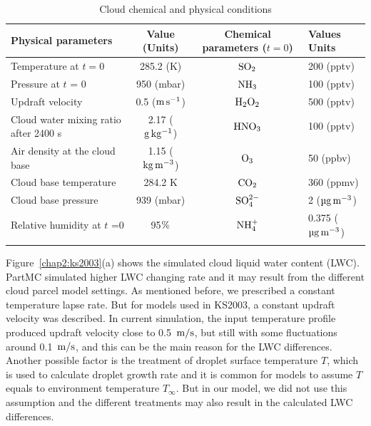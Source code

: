 \documentclass[edeposit,fullpage]{uiucthesis2009}
\makeatletter
\DeclareRobustCommand*\unit[1]
 {\ensuremath{%
   {\thinmuskip3mu\relax
    \def\mu{\text{\textmu}}\def~{\,}%
    \ifx\f@series\testbx\mathbf{#1}\else\mathrm{#1}\fi}}}
\makeatother
\begin{document}
\begin{table}[ht]
\centering
\begin{threeparttable}
\caption{Cloud  chemical and physical conditions}
 \begin{tabular}{l c|c l}
 \hline
  Physical parameters & Value (Units) & Chemical parameters ($t = 0$) & Values Units\\
 \hline
 Temperature at $t =0$ & 285.2 (K)&$\rm SO_2$ & 200 (pptv)\\
 Pressure at $t$ = 0 & 950 (mbar)&$\rm NH_3$ & 100 (pptv)\\
 Updraft velocity & 0.5 ($\rm m\,s^{-1}$)&$\rm H_2O_2$ & 500 (pptv)\\
 Cloud water mixing ratio after 2400 s& 2.17 ($\rm g\,kg^{-1}$)&$\rm HNO_3$  & 100 (pptv)\\
 Air density at the cloud base & 1.15 ($\rm kg\,m^{-3}$) & $\rm O_3$ &50 (ppbv)\\
 Cloud base temperature& 284.2 K&$\rm CO_2$ & 360 (ppmv)\\
 Cloud base pressure& 939 (mbar)& $\rm SO_4^{2-}$ & 2 ($\rm \mu g \, m^{-3}$)\\ 
 Relative humidity at $t$ =0 & 95$\rm \%$ & $\rm NH_4^+$ & 0.375 ($\rm \mu g\, m^{-3}$)\\
 \hline
 \label{setting}
\end{tabular}
\end{threeparttable}
\end{table}

Figure~\ref{chap2:ks2003}(a) shows the simulated cloud liquid water content (LWC). PartMC simulated higher LWC changing rate and it may result from the different cloud parcel model settings. As mentioned before, we prescribed a constant temperature lapse rate. But for models used in KS2003, a constant updraft velocity was described. In current simulation, the input temperature profile produced updraft velocity close to 0.5~\unit{m/s}, but still with some fluctuations around 0.1~\unit{m/s}, and this can be the main reason for the LWC differences. Another possible factor is the treatment of droplet surface temperature $T$, which is used to calculate droplet growth rate and it is common for models to assume $T$ equals to environment temperature $T_\infty$. But in our model, we did not use this assumption and the different treatments may also result in the calculated LWC differences.
\end{document}

